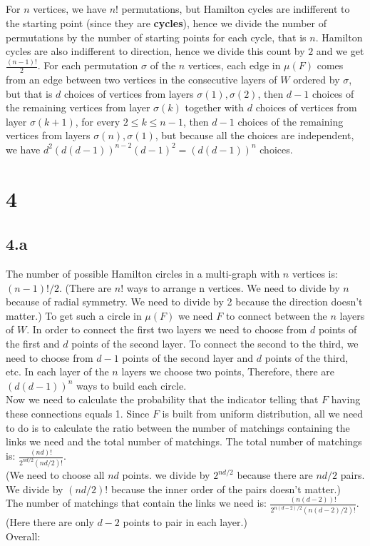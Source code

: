 \documentclass{article}
\begin{document}
\subsection{}
For $n$ vertices, we have $n!$ permutations, but Hamilton cycles are indifferent to the starting point (since they are \textbf{cycles}), hence we divide the number of permutations by the number of starting points for each cycle, that is $n$. Hamilton cycles are also indifferent to direction, hence we divide this count by $2$ and we get $\frac{(n-1)!}{2}$. For each permutation $\sigma$ of the $n$ vertices, each edge in $\mu(F)$ comes from an edge between two vertices in the consecutive layers of $W$ ordered by $\sigma$, but that is $d$ choices of vertices from layers $\sigma(1),\sigma(2)$, then $d-1$ choices of the remaining vertices from layer $\sigma(k)$ together with $d$ choices of vertices from layer $\sigma(k+1)$, for every $2\leq{k}\leq{n-1}$, then $d-1$ choices of the remaining vertices from layers $\sigma(n),\sigma(1)$, but because all the choices are independent, we have $d^2(d(d-1))^{n-2}(d-1)^2=(d(d-1))^n$ choices.
\section*{4}
\subsection*{4.a}

The number of possible Hamilton circles in a multi-graph with $n$ vertices is: $(n-1)!/2$.
(There are $n!$ ways to arrange n vertices. We need to divide by $n$ because of radial symmetry. We need to divide by 2 because the direction doesn't matter.)
To get such a circle in $\mu(F)$ we need $F$ to connect between the $n$ layers of $W$. In order to connect the first two layers we need to choose from $d$ points of the first and $d$ points of the second layer. To connect the second to the third, we need to choose from $d-1$ points of the second layer and $d$ points of the third, etc. In each layer of the $n$ layers we choose two points, Therefore, there are $(d(d-1))^n$ ways to build each circle.\\
Now we need to calculate the probability that the indicator telling that $F$ having these connections equals 1.
Since $F$ is built from uniform distribution, all we need to do is to calculate the ratio between the number of matchings containing the links we need and the total number of matchings. 
The total number of matchings is: $\frac{(nd)!}{2^{nd/2}(nd/2)!}$.\\
(We need to choose all $nd$ points. we divide by $2^{nd/2}$ because there are $nd/2$ pairs. We divide by $(nd/2)!$ because the inner order of the pairs doesn't matter.)\\
The number of matchings that contain the links we need is: $\frac{(n(d-2))!}{2^{n(d-2)/2}(n(d-2)/2)!}$. \\
(Here there are only $d-2$ points to pair in each layer.)\\
Overall:
\end{document}
